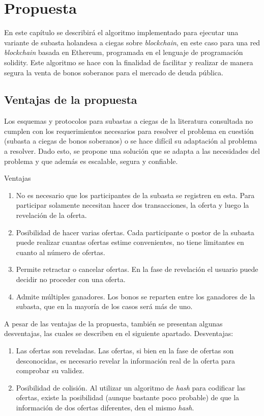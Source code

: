 \chapter{Propuesta}\label{chapter:proposal}

  En este capítulo se describirá el algoritmo implementado para ejecutar una variante de subasta holandesa
a ciegas sobre \textit{blockchain}, en este caso para una red \textit{blockchain} basada en Ethereum, programada en el 
lenguaje de programación solidity. Este algoritmo se hace con la finalidad de facilitar y realizar de manera
segura la venta de bonos soberanos para el mercado de deuda pública. 

  \section{Ventajas de la propuesta}
    Los esquemas y protocolos para subastas a ciegas de la literatura consultada no cumplen con los requerimientos necesarios
    para resolver el problema en cuestión (subasta a ciegas de bonos soberanos) o se hace difícil su adaptación al problema a resolver.
    Dado esto, se propone una solución que se adapta a las necesidades del problema y que además es escalable, segura y confiable.

    Ventajas

    \begin{enumerate}
      \item No es necesario que los participantes de la subasta se registren en esta. Para participar solamente necesitan hacer dos 
      transacciones, la oferta y luego la revelación de la oferta.
      \item Posibilidad de hacer varias ofertas. Cada participante o postor de la subasta puede realizar cuantas ofertas estime convenientes,
      no tiene limitantes en cuanto al número de ofertas.
      \item Permite retractar o cancelar ofertas. En la fase de revelación el usuario puede decidir no proceder con una oferta.
      \item Admite múltiples ganadores. Los bonos se reparten entre los ganadores de la subasta, que en la mayoría de los casos será más 
      de uno. 
    \end{enumerate}

    A pesar de las ventajas de la propuesta, también se presentan algunas desventajas, las cuales se 
    describen en el siguiente apartado. Desventajas:
  
    \begin{enumerate}
      \item Las ofertas son reveladas. Las ofertas, si bien en la fase de ofertas son desconocidas, es necesario revelar la información
      real de la oferta para comprobar su validez.
      \item Posibilidad de colisión. Al utilizar un algoritmo de \textit{hash} para codificar las ofertas, existe la posibilidad (aunque bastante
      poco probable) de que la información de dos ofertas diferentes, den el mismo \textit{hash}. 
    \end{enumerate}

